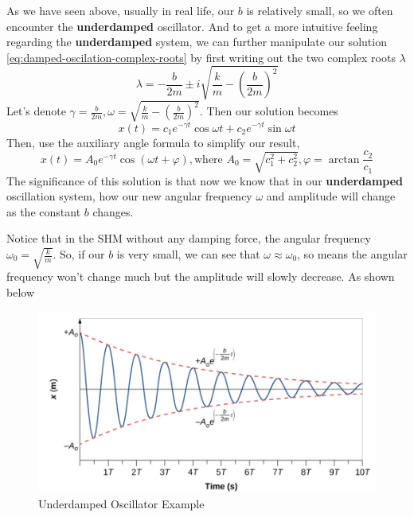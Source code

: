 \documentclass[math,code]{amznotes}
\theoremstyle{remark}
\begin{document}
As we have seen above, usually in real life, our $b$ is relatively small, so we often encounter the \textbf{underdamped} oscillator. And to get a more intuitive feeling regarding the \textbf{underdamped} system, we can further manipulate our solution \ref{eq:damped-oscilation-complex-roots} by first writing out the two complex roots $\lambda$
\begin{equation}
    \lambda=-\frac{b}{2m}\pm i\sqrt{\frac{k}{m}-(\frac{b}{2m})^2}
\end{equation}
Let's denote $\gamma=\frac{b}{2m},\omega=\sqrt{\frac{k}{m}-(\frac{b}{2m})^2}$. Then our solution becomes
\begin{equation}
    x(t)=c_1e^{-\gamma t}\cos \omega t+c_2e^{-\gamma t}\sin \omega t
\end{equation}
Then, use the auxiliary angle formula to simplify our result,
\begin{equation}
    x(t)=A_0e^{-\gamma t}\cos(\omega t+\varphi), \text{where }A_0=\sqrt{c_1^2+c_2^2},\varphi=\arctan\frac{c_2}{c_1}
\end{equation}
The significance of this solution is that now we know that in our \textbf{underdamped} oscillation system, how our new angular frequency $\omega$ and amplitude will change as the constant $b$ changes.

Notice that in the SHM without any damping force, the angular frequency $\omega_0=\sqrt{\frac{k}{m}}$. So, if our $b$ is very small, we can see that $\omega\approx\omega_0$, so means the angular frequency won't change much but the amplitude will slowly decrease. As shown below
\begin{figure}[h]
    \centering
    \includegraphics[width=0.75\linewidth]{images/underdamped-oscillator-example.png}
    \caption{Underdamped Oscillator Example}
    \label{fig:underdamped-oscillator-example}
\end{figure}
\end{document}
